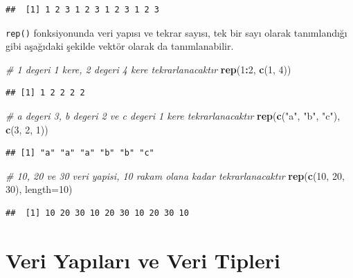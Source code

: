 \documentclass[
]{book}
\newenvironment{Shaded}{\begin{snugshade}}{\end{snugshade}}
\newcommand{\AttributeTok}[1]{\textcolor[rgb]{0.13,0.29,0.53}{#1}}
\newcommand{\CommentTok}[1]{\textcolor[rgb]{0.56,0.35,0.01}{\textit{#1}}}
\newcommand{\DecValTok}[1]{\textcolor[rgb]{0.00,0.00,0.81}{#1}}
\newcommand{\FunctionTok}[1]{\textcolor[rgb]{0.13,0.29,0.53}{\textbf{#1}}}
\newcommand{\NormalTok}[1]{#1}
\newcommand{\SpecialCharTok}[1]{\textcolor[rgb]{0.81,0.36,0.00}{\textbf{#1}}}
\newcommand{\StringTok}[1]{\textcolor[rgb]{0.31,0.60,0.02}{#1}}
\begin{document}
\begin{verbatim}
##  [1] 1 2 3 1 2 3 1 2 3 1 2 3
\end{verbatim}

\texttt{rep()} fonksiyonunda veri yapısı ve tekrar sayısı, tek bir sayı olarak tanımlandığı gibi aşağıdaki şekilde vektör olarak da tanımlanabilir.

\begin{Shaded}
\begin{Highlighting}[]
\CommentTok{\# 1 degeri 1 kere, 2 degeri 4 kere tekrarlanacaktır}
\FunctionTok{rep}\NormalTok{(}\DecValTok{1}\SpecialCharTok{:}\DecValTok{2}\NormalTok{, }\FunctionTok{c}\NormalTok{(}\DecValTok{1}\NormalTok{, }\DecValTok{4}\NormalTok{))   }
\end{Highlighting}
\end{Shaded}

\begin{verbatim}
## [1] 1 2 2 2 2
\end{verbatim}

\begin{Shaded}
\begin{Highlighting}[]
\CommentTok{\# a degeri 3, b degeri 2 ve c degeri 1 kere tekrarlanacaktır}
\FunctionTok{rep}\NormalTok{(}\FunctionTok{c}\NormalTok{(}\StringTok{"a"}\NormalTok{, }\StringTok{"b"}\NormalTok{, }\StringTok{"c"}\NormalTok{), }\FunctionTok{c}\NormalTok{(}\DecValTok{3}\NormalTok{, }\DecValTok{2}\NormalTok{, }\DecValTok{1}\NormalTok{)) }
\end{Highlighting}
\end{Shaded}

\begin{verbatim}
## [1] "a" "a" "a" "b" "b" "c"
\end{verbatim}

\begin{Shaded}
\begin{Highlighting}[]
\CommentTok{\# 10, 20 ve 30 veri yapisi, 10 rakam olana kadar tekrarlanacaktır}
\FunctionTok{rep}\NormalTok{(}\FunctionTok{c}\NormalTok{(}\DecValTok{10}\NormalTok{, }\DecValTok{20}\NormalTok{, }\DecValTok{30}\NormalTok{), }\AttributeTok{length=}\DecValTok{10}\NormalTok{)    }
\end{Highlighting}
\end{Shaded}

\begin{verbatim}
##  [1] 10 20 30 10 20 30 10 20 30 10
\end{verbatim}

\chapter{Veri Yapıları ve Veri Tipleri}\label{veri-yapux131larux131-ve-veri-tipleri}
\end{document}
